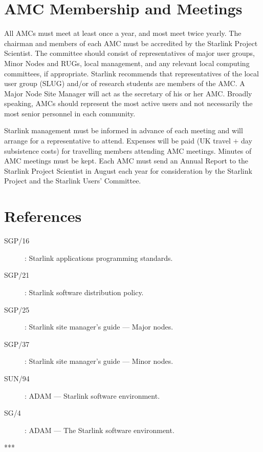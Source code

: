 \section{AMC Membership and Meetings}

All AMCs must meet at least once a year, and most meet twice yearly.
The chairman and members of each AMC must be accredited by the Starlink Project
Scientist.
The committee should consist of representatives of major user groups, Minor
Nodes and RUGs, local management, and any relevant local computing committees,
if appropriate.
Starlink recommends that representatives of the local user group (SLUG) and/or
of research students are members of the AMC.
A Major Node Site Manager will act as the secretary of his or her AMC.
Broadly speaking, AMCs should represent the most active users and not
necessarily the most senior personnel in each community.

Starlink management must be informed in advance of each meeting and will
arrange for a representative to attend.
Expenses will be paid (UK travel $+$ day subsistence costs) for travelling
members attending AMC meetings.
Minutes of AMC meetings must be kept.
Each AMC must send an Annual Report to the Starlink Project Scientist in August
each year for consideration by the Starlink Project and the Starlink Users'
Committee.

\section {References}

\begin{description}
\begin{description}
\item [SGP/16]: Starlink applications programming standards.
\item [SGP/21]: Starlink software distribution policy.
\item [SGP/25]: Starlink site manager's guide --- Major nodes.
\item [SGP/37]: Starlink site manager's guide --- Minor nodes.
\item [SUN/94]: ADAM --- Starlink software environment.
\item [SG/4]:   ADAM --- The Starlink software environment.
\end{description}
\end{description}



***


